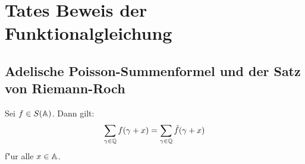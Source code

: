 \section{Tates Beweis der Funktionalgleichung}
\subsection{Adelische Poisson-Summenformel und der Satz von Riemann-Roch}
	\begin{satz}\label{satz:adelic-poisson}
		Sei $f \in S(\mathbb{A})$. Dann gilt:
		\begin{align}
			\sum_{\gamma \in \mathbb{Q}} {f(\gamma + x)} = \sum_{\gamma \in \mathbb{Q}}{\hat{f}(\gamma + x)}
		\end{align}
		f"ur alle $x \in \mathbb{A}$.
	\end{satz}
